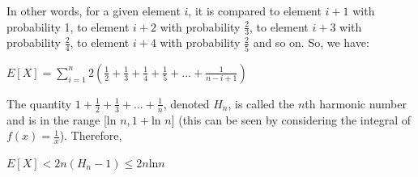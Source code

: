 \documentclass[12pt]{article}
\begin{document}
In other words, for a given element $i$, it is compared to element $i + 1$ with probability 1, to element $i + 2$ with probability $\frac 2 3$, to element $i + 3$ with probability $\frac 2 4$, to element $i + 4$ with probability $\frac 2 5$ and so on. So, we have:

\begin{center}
   $\displaystyle E[X] = \sum_{i=1} ^{n} {2(\frac 1 2 + \frac 1 3 + \frac 1 4 + \frac 1 5 + ... + \frac 1 {n-i+1} )} $
\end{center}

 The quantity $1 + \frac 1 2 + \frac 1 3 + ... + \frac 1 {n} $, denoted $H_n$, is called the $n$th harmonic number and is in the range [ln $n, 1 + $ln $n$] (this can be seen by considering the integral of $f (x) = \frac 1 x$). Therefore,
 
 \begin{center}
   $\displaystyle E[X] <  2n( H_n - 1) \le 2n $ln$ n$
\end{center}
 
 
 
 
 
 \pagebreak

    
    
    
    
    
    
    
    
    
    
    
    
    
    
    
    
    
    
    
    
    
    
    
    
    
\end{document}
